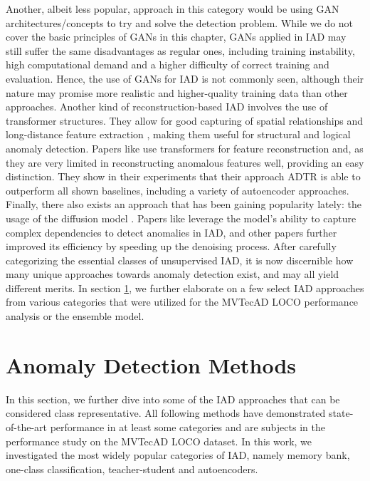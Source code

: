 Another, albeit less popular, approach in this category would be using GAN architectures/concepts to try and solve the detection problem. While we do not cover the basic principles of GANs in 
this chapter, GANs applied in IAD may still suffer the same disadvantages as regular ones, including training instability, high computational demand and a higher difficulty of correct training and 
evaluation. Hence, the use of GANs for IAD is not commonly seen, although their nature may promise more realistic and higher-quality training data than other approaches.
Another kind of reconstruction-based IAD involves the use of transformer structures. They allow for good capturing of spatial relationships and long-distance feature extraction \cite{xie2020benchmarking},
making them useful for structural and logical anomaly detection. Papers like \cite{You_2023transformer} use transformers for feature reconstruction and, as they are very 
limited in reconstructing anomalous features well, providing an easy distinction. They show in their experiments that their approach ADTR is able to outperform all shown baselines, including 
a variety of autoencoder approaches.
Finally, there also exists an approach that has been gaining popularity lately: the usage of the diffusion model \cite{ho2020denoisingdiffusionOG}. Papers like \cite{Wyatt_2022diffusionfirstapproach} 
leverage the model's ability to capture complex dependencies to detect anomalies in IAD, and other papers \cite{zhang2023diffusionaddiffusionmodern} further improved its efficiency by speeding up 
the denoising process.
\newline
After carefully categorizing the essential classes of unsupervised IAD, it is now discernible how many unique approaches towards anomaly detection exist, and may all yield different merits. 
In section \ref{sec:IADmethods}, we further elaborate on a few select IAD approaches from various categories that were utilized for the MVTecAD LOCO performance analysis or the ensemble 
model. 


\section{Anomaly Detection Methods}
\label{sec:IADmethods}
In this section, we further dive into some of the IAD approaches that can be considered class representative. All following methods have demonstrated state-of-the-art performance in 
at least some categories and are subjects in the performance study on the MVTecAD LOCO dataset. In this work, we investigated the most widely popular categories of 
IAD, namely memory bank, one-class classification, teacher-student and autoencoders.

